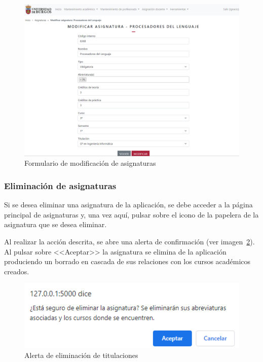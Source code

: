 \begin{figure}
	\centering
	\includegraphics[width=\textwidth]{../img/Anexos/Manual usuario/formModAsignatura.png}
	\caption{Formulario de modificación de asignaturas}\label{pag:formModAsignatura}
\end{figure}

\subsubsection{Eliminación de asignaturas}
Si se desea eliminar una asignatura de la aplicación, se debe acceder a la página principal de asignaturas y, una vez aquí, pulsar sobre el icono de la papelera de la asignatura que se desea eliminar.

Al realizar la acción descrita, se abre una alerta de confirmación (ver imagen~\ref{pag:alertElAsignatura}).
Al pulsar sobre <<Aceptar>> la asignatura se elimina de la aplicación produciendo un borrado en cascada de sus relaciones con los cursos académicos creados.

\begin{figure}
	\centering
	\includegraphics[width=.8\textwidth]{../img/Anexos/Manual usuario/alertElAsignatura.png}
	\caption{Alerta de eliminación de titulaciones}\label{pag:alertElAsignatura}
\end{figure}

